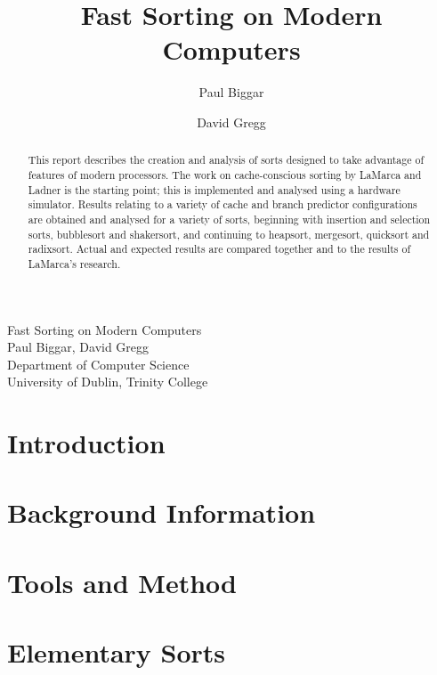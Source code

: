 \documentclass[dvips]{report}
\title{Fast Sorting on Modern Computers}
\author{Paul Biggar \and David Gregg}
\date{}
\begin{document}
\begin{titlepage}
        \begin{center}
                \vspace*{95mm}
                \LARGE Fast Sorting on Modern Computers\\
                \vspace{1em}
                \large Paul Biggar, David Gregg\\
                \large Department of Computer Science\\
				\large University of Dublin, Trinity College
        \end{center}
\end{titlepage}


\begin{abstract}
This report describes the creation and analysis of sorts designed to take
advantage of features of modern processors. The work on cache-conscious sorting
by LaMarca and Ladner is the starting point; this is implemented and analysed
using a hardware simulator. Results relating to a variety of cache and branch
predictor configurations are obtained and analysed for a variety of sorts,
beginning with insertion and selection sorts, bubblesort and shakersort, and
continuing to heapsort, mergesort, quicksort and radixsort. Actual and expected
results are compared together and to the results of LaMarca's research.
\end{abstract}

\tableofcontents
\listoffigures

\setlength{\parskip}{1em}
\setlength{\parindent}{0ex}

\chapter{Introduction}



\chapter{Background Information}



\chapter{Tools and Method}



\chapter{Elementary Sorts}
\end{document}
